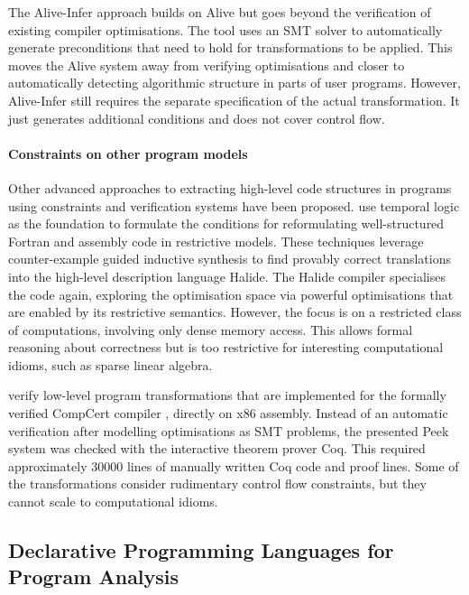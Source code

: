     The Alive-Infer approach \citep{Menendez:2017:ADP:3062341.3062372} builds on
    Alive but goes beyond the verification of existing compiler optimisations.
    The tool uses an SMT solver to automatically generate preconditions that
    need to hold for transformations to be applied.
    This moves the Alive system away from verifying optimisations and
    closer to automatically detecting algorithmic structure in parts of user
    programs.
    However, Alive-Infer still requires the separate specification of the actual
    transformation.
    It just generates additional conditions and does not cover control flow.

    \paragraph*{Constraints on other program models}
    Other advanced approaches to extracting high-level code structures
    in programs using constraints and verification systems have been
    proposed.
    \citet{Mendis2015Helium, Kamil2016Verified} use temporal logic as the
    foundation to formulate the conditions for reformulating well-structured
    Fortran and assembly code in restrictive models.
    These techniques leverage counter-example guided inductive synthesis to find
    provably correct translations into the high-level description language
    Halide.
    The Halide compiler specialises the code again, exploring the
    optimisation space via powerful optimisations that are enabled by its
    restrictive semantics.
    However, the focus is on a restricted class of computations, involving only
    dense memory access.
    This allows formal reasoning about correctness but is too restrictive for
    interesting computational idioms, such as sparse linear algebra.

    \citet{Mullen:2016:VPO:2908080.2908109} verify low-level program
    transformations that are implemented for the formally verified CompCert
    compiler \citep{CompCert-ERTS-2018}, directly on x86 assembly.
    Instead of an automatic verification after modelling optimisations
    as SMT problems, the presented Peek system was checked with the interactive
    theorem prover Coq.
    This required approximately 30000 lines of manually written Coq code and
    proof lines.
    Some of the transformations consider rudimentary control flow constraints,
    but they cannot scale to computational idioms.

\subsection{Declarative Programming Languages for Program Analysis}


